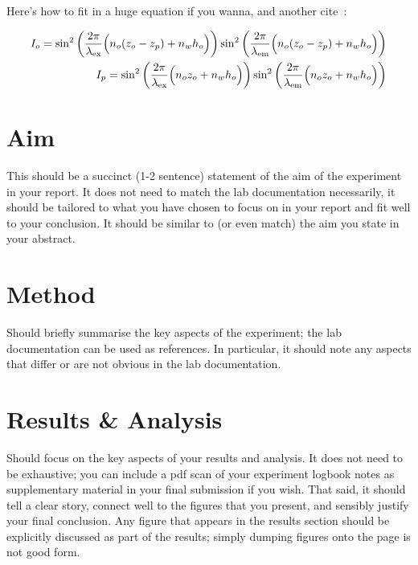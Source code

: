 \documentclass[aps,prl,reprint,10pt,amsmath,amssymb,superscriptaddress,a4paper]{revtex4-2}
\begin{document}
\lipsum[2] %

Here's how to fit in a huge equation if you wanna, and another cite~\citep{ParthasarathyCBB04}:

\begin{widetext}
\begin{eqnarray}
\label{eqn2} I_{o} = \sin^{2}\left(\frac{2\pi}{\lambda_{\text{ex}}}\Bigl(n_{o}(z_{o}-z_{p})+n_{w}h_{o}\Bigr)\right)\sin^{2}\left(\frac{2\pi}{\lambda_{\text{em}}}\Bigl(n_{o}(z_{o}-z_{p})+n_{w}h_{o}\Bigr)\right) \\
\label{eqn3} I_{p} = \sin^{2}\left(\frac{2\pi}{\lambda_{\text{ex}}}\Bigl(n_{o}z_{o}+n_{w}h_{o}\Bigr)\right)\sin^{2}\left(\frac{2\pi}{\lambda_{\text{em}}}\Bigl(n_{o}z_{o}+n_{w}h_{o}\Bigr)\right)
\end{eqnarray}
\end{widetext}

\lipsum[3] %

\section{Aim}

This should be a succinct (1-2 sentence) statement of the aim of the experiment in your report. It does not need to match the lab documentation necessarily, it should be tailored to what you have chosen to focus on in your report and fit well to your conclusion. It should be similar to (or even match) the aim you state in your abstract.

\section{Method}

Should briefly summarise the key aspects of the experiment; the lab documentation can be used as references. In particular, it should note any aspects that differ or are not obvious in the lab documentation.

\lipsum[4] %

\section{Results \& Analysis}

Should focus on the key aspects of your results and analysis. It does not need to be exhaustive; you can include a pdf scan of your experiment logbook notes as supplementary material in your final submission if you wish. That said, it should tell a clear story, connect well to the figures that you present, and sensibly justify your final conclusion. Any figure that appears in the results section should be explicitly discussed as part of the results; simply dumping figures onto the page is not good form.
\end{document}
